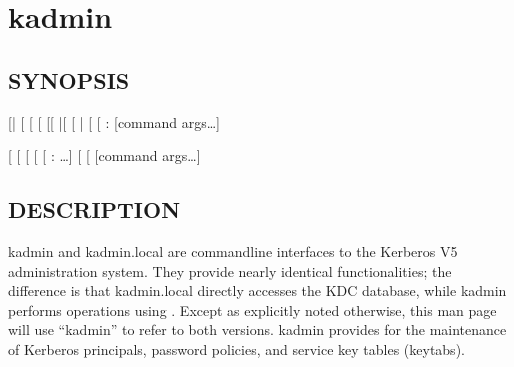 \documentclass[letterpaper,10pt,english]{sphinxmanual}
\begin{document}
\section{kadmin}
\label{\detokenize{admin/admin_commands/kadmin_local:kadmin}}\label{\detokenize{admin/admin_commands/kadmin_local:kadmin-1}}\label{\detokenize{admin/admin_commands/kadmin_local::doc}}

\subsection{SYNOPSIS}
\label{\detokenize{admin/admin_commands/kadmin_local:synopsis}}\label{\detokenize{admin/admin_commands/kadmin_local:kadmin-synopsis}}
\sphinxAtStartPar
{}
{[}|\sphinxstylestrong{\sphinxhyphen{}N}{]}
{[} \sphinxstyleemphasis{realm}{]}
{[} \sphinxstyleemphasis{principal}{]}
{[} \sphinxstyleemphasis{query}{]}
{[}{[} \sphinxstyleemphasis{cache\_name}{]}|{[} {[} \sphinxstyleemphasis{keytab}{]}{]}|\sphinxstylestrong{\sphinxhyphen{}n}{]}
{[} \sphinxstyleemphasis{password}{]}
{[} \sphinxstyleemphasis{admin\_server}{[}:\sphinxstyleemphasis{port}{]}{]}
{[}command args…{]}

\sphinxAtStartPar
{}
{[} \sphinxstyleemphasis{realm}{]}
{[} \sphinxstyleemphasis{principal}{]}
{[} \sphinxstyleemphasis{query}{]}
{[} \sphinxstyleemphasis{dbname}{]}
{[} : …{]}
{[}\sphinxstylestrong{\sphinxhyphen{}m}{]}
{[} \sphinxstyleemphasis{db\_args}{]}
{[}command args…{]}


\subsection{DESCRIPTION}
\label{\detokenize{admin/admin_commands/kadmin_local:description}}
\sphinxAtStartPar
kadmin and kadmin.local are command\sphinxhyphen{}line interfaces to the Kerberos V5
administration system.  They provide nearly identical functionalities;
the difference is that kadmin.local directly accesses the KDC
database, while kadmin performs operations using {\hyperref[\detokenize{admin/admin_commands/kadmind:kadmind-8}]{}}.
Except as explicitly noted otherwise, this man page will use “kadmin”
to refer to both versions.  kadmin provides for the maintenance of
Kerberos principals, password policies, and service key tables
(keytabs).
\end{document}
